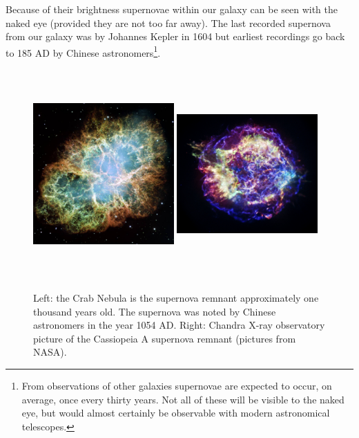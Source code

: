 Because of their brightness supernovae within our galaxy can be seen with the naked eye (provided they are not too far away). The last recorded supernova from our galaxy was by Johannes Kepler in 1604 but earliest recordings go back to 185 AD by Chinese astronomers\footnote{From observations of other galaxies supernovae are expected to occur, on average, once every thirty years. Not all of these will be visible to the naked eye, but would almost certainly be observable with modern astronomical telescopes.}.
\begin{figure}
\label{fig:supernova}
\centering
\includegraphics[width=0.48\textwidth,height=8cm]{chapter3/img/crabnebula.jpg}
\includegraphics[width=0.48\textwidth,height=8cm]{chapter3/img/casa.jpg}
\caption{Left: the Crab Nebula is the supernova remnant approximately one thousand years old. The supernova was noted by Chinese astronomers in the year 1054 AD. Right: Chandra X-ray observatory picture of the Cassiopeia A supernova remnant (pictures from NASA).}
\end{figure}
\newline
